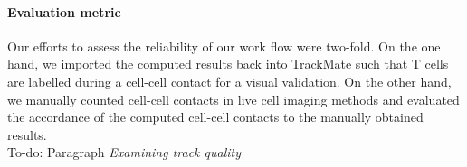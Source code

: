 \documentclass{report}
\begin{document}
\paragraph{Evaluation metric}
Our efforts to assess the reliability of our work flow were two-fold. On the one hand, we imported the computed results back into TrackMate such that T cells are labelled during a cell-cell contact for a visual validation. On the other hand, we manually counted cell-cell contacts in live cell imaging methods and evaluated the accordance of the computed cell-cell contacts to the manually obtained results.\\

To-do: Paragraph \textit{Examining track quality}



\renewcommand{\bibname}{References}

\end{document}
